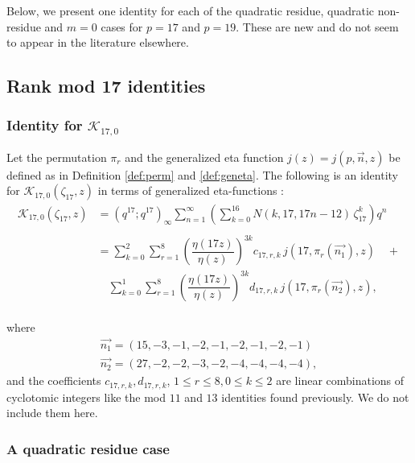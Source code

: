 \documentclass[12pt]{amsart}
\theoremstyle{definition}
\theoremstyle{remark}
\numberwithin{equation}{section}
\newcommand\Lpar[1]{\left(#1\right)}
\newcommand\refdef[1]{\ref{def:#1}}
\begin{document}
Below, we present one identity for each of the quadratic residue, quadratic non-residue and $m=0$ cases for $p=17$ and  $p=19$. These are new and do not seem to appear in the literature elsewhere. \\
\subsection{Rank mod 17 identities}
\label{subsec:mod17}

\subsubsection{\textbf{Identity for $\mathcal{K}_{17,0}$}}


Let the permutation $\pi_r$ and the generalized eta function $j(z)=j(p,\overrightarrow{n},z)$ be defined as in Definition \refdef{perm} and \refdef{geneta}. The following is an identity for $\mathcal{K}_{17,0}(\zeta_{17},z)$ in terms of generalized eta-functions :
\\
\begin{align}
\mathcal{K}_{17,0}(\zeta_{17},z)&=(q^{17};q^{17})_\infty \sum_{n=1}^\infty \Lpar{\sum_{k=0}^{16} N(k,17,17n-12)\,\zeta_{17}^k}q^n \label{eq:rank17id1} \\
\nonumber
\\
\nonumber
&=\sum_{k=0}^{2}\sum_{r=1}^{8} \left(\dfrac{\eta(17z)}{\eta(z)}\right)^{3k}c_{17,r,k}\,j(17,\pi_r(\overrightarrow{n_1}),z)\quad+
\\
&\quad\sum_{k=0}^{1}\sum_{r=1}^{8} \left(\dfrac{\eta(17z)}{\eta(z)}\right)^{3k}d_{17,r,k}\,j(17,\pi_r(\overrightarrow{n_2}),z),
\nonumber
\end{align}
\\
where 
\begin{align*}
\overrightarrow{n_1}=(15,-3,-1,-2,-1,-2,-1,-2,-1)
\\
\overrightarrow{n_2}=(27,-2,-2,-3,-2,-4,-4,-4,-4),
\end{align*}
and the coefficients $c_{17,r,k}, d_{17,r,k}$, $1\leq r \leq 8, 0\leq k \leq 2$ are linear combinations of cyclotomic integers like the mod $11$ and $13$ identities found previously. We do not include them here.
\\
\subsubsection{\textbf{A quadratic residue case}}
\end{document}
